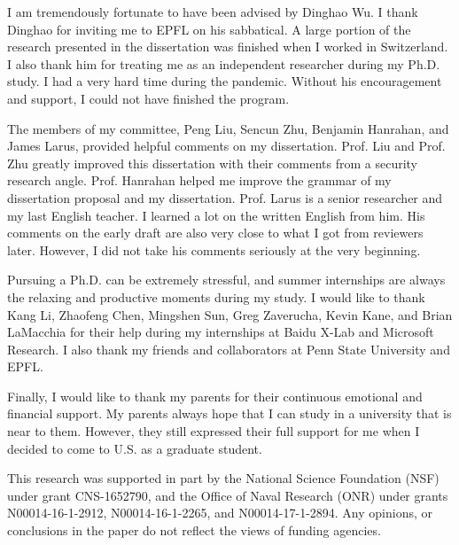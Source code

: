 I am tremendously fortunate to have been advised by Dinghao Wu.  I thank Dinghao for inviting me to EPFL on his sabbatical. A large portion of the research presented in the dissertation was finished when I worked in Switzerland. I also thank him for treating me as an independent researcher during my Ph.D. study. I had a very hard time during the pandemic. Without his encouragement and support, I could not have finished the program.

The members of my committee, Peng Liu, Sencun Zhu, Benjamin Hanrahan, and James Larus, provided helpful comments on my dissertation. Prof. Liu and Prof. Zhu greatly improved this dissertation with their comments from a security research angle. Prof. Hanrahan helped me improve the grammar of my dissertation proposal and my dissertation. Prof. Larus is a senior researcher and my last English teacher. I learned a lot on the written English from him.  His comments on the early draft are also very close to what I got from reviewers later. However, I did not take his comments seriously at the very beginning.  

Pursuing a Ph.D. can be extremely stressful, and summer internships are always the relaxing and productive moments during my study. I would like to thank Kang Li, Zhaofeng Chen, Mingshen Sun, Greg Zaverucha, Kevin Kane, and Brian LaMacchia for their help during my internships at Baidu X-Lab and Microsoft Research.  I also thank my friends and collaborators at Penn State University and EPFL. 

Finally, I would like to thank my parents for their continuous emotional and financial support. My parents always hope that I can study in a university that is near to them. However, they still expressed their full support for me when I decided to come to U.S. as a graduate student.

This research was supported in part by the National Science Foundation (NSF) under grant CNS-1652790, and the Office of Naval Research (ONR) under grants N00014-16-1-2912, N00014-16-1-2265, and N00014-17-1-2894. Any opinions, or conclusions in the paper do not reflect the views of funding agencies.

